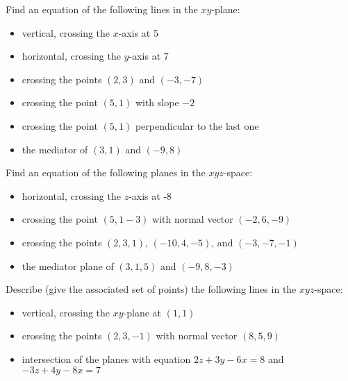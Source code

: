 \begin{question} Find an equation of the following lines in the $xy$-plane:
    \begin{itemize}
        \item vertical, crossing the $x$-axis at 5
        \item horizontal, crossing the $y$-axis at 7
        \item crossing the points $(2,3)$ and $(-3,-7)$
        \item crossing the point $(5,1)$ with slope $-2$
        \item crossing the point $(5,1)$ perpendicular to the last one
        \item the mediator of $(3,1)$ and $(-9,8)$
    \end{itemize}
\end{question}
\begin{question} Find an equation of the following planes in the $xyz$-space:
    \begin{itemize}
        \item horizontal, crossing the $z$-axis at -8
        \item crossing the point $(5,1-3)$ with normal vector $(-2,6,-9)$
        \item crossing the points $(2,3,1)$, $(-10,4,-5)$, and $(-3,-7,-1)$
        \item the mediator plane of $(3,1,5)$ and $(-9,8,-3)$
    \end{itemize}
\end{question}
\begin{question} Describe (give the associated set of points) the following lines in the $xyz$-space:
    \begin{itemize}
        \item vertical, crossing the $xy$-plane at $(1,1)$
        \item crossing the points $(2,3,-1)$ with normal vector $(8,5,9)$
        \item intersection of the planes with equation $2z+3y-6x=8$ and $-3z+4y-8x=7$
    \end{itemize}
\end{question}



